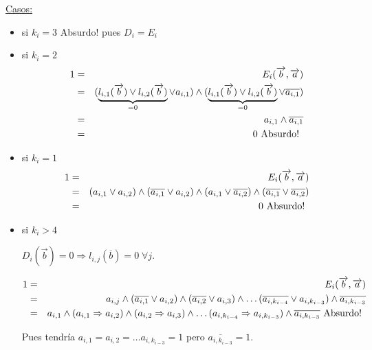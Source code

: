 \documentclass[12pt,a4paper]{report}
\begin{document}
		\underline{Casos:}
			\begin{itemize}
				\item si $k_{i} = 3$ Absurdo! pues $D_{i} = E_{i}$
				\item si $k_{i} = 2$
					\begin{eqnarray}
						\nonumber 1 &=& E_{i}(\overrightarrow{b}, \overrightarrow{a}) \\
						\nonumber &=& (\underbrace{l_{i, 1}(\overrightarrow{b}) \vee l_{i, 2}(\overrightarrow{b})}_{= 0} \vee a_{i, 1}) \wedge (\underbrace{l_{i, 1}(\overrightarrow{b}) \vee l_{i, 2}(\overrightarrow{b})}_{= 0} \vee \overline{a_{i, 1}}) \\
						\nonumber &=& a_{i, 1} \wedge \overline{a_{i, 1}} \\
						\nonumber &=& 0 \textup{ Absurdo! }
					\end{eqnarray}
				\item si $k_{i} = 1$
					\begin{eqnarray}
						\nonumber 1 &=& E_{i}(\overrightarrow{b}, \overrightarrow{a}) \\
						\nonumber &=& (a_{i, 1} \vee a_{i, 2}) \wedge (\overline{a_{i, 1}} \vee a_{i, 2}) \wedge (a_{i, 1} \vee \overline{a_{i, 2}}) \wedge (\overline{a_{i, 1}} \vee \overline{a_{i, 2}}) \\
						\nonumber &=& 0 \textup{ Absurdo! }
					\end{eqnarray}
				\item si $k_{i} > 4$

					$D_{i}(\overrightarrow{b}) = 0 \Rightarrow l_{i, j}(\overline{b}) = 0 \; \forall j$.

					\begin{eqnarray}
						\nonumber 1 &=& E_{i}(\overrightarrow{b}, \overrightarrow{a}) \\
						\nonumber &=& a_{i, j} \wedge (\overline{a_{i, 1}} \vee a_{i, 2}) \wedge (\overline{a_{i, 2}} \vee a_{i, 3}) \wedge \dotsc  	(\overline{a_{i, k_{i-4}}} \vee a_{i, k_{i-3}}) \wedge \overline{a_{i, k_{i-3}}} \\
						\nonumber &=& a_{i, 1} \wedge (a_{i, 1} \Rightarrow a_{i, 2}) \wedge (a_{i, 2}\Rightarrow a_{i, 3}) \wedge 	\dotsc (a_{i, k_{i-4}} \Rightarrow a_{i, k_{i-3}}) \wedge \overline{a_{i, k_{i-3}}} \textup{ Absurdo! }
					\end{eqnarray}

					Pues tendría $a_{i, 1} = a_{i, 2} = \dotsc a_{i, k_{i-3}} = 1$ pero $\overline{a_{i, k_{i-3}}} = 1$.
			\end{itemize}
\end{document}
